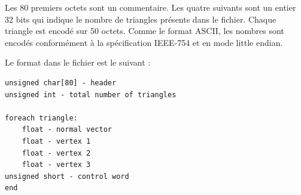 Les 80 premiers octets sont un commentaire. Les quatre suivants sont un entier 32 bits qui indique le nombre de triangles présents dans le fichier.
Chaque triangle est encodé sur 50 octets. Comme le format ASCII, les nombres sont encodés conformément à la spécification IEEE-754 et en mode little endian.

Le format dans le fichier est le suivant : 

\begin{lstlisting}[frame=single]
unsigned char[80] - header
unsigned int - total number of triangles

foreach triangle:
    float - normal vector
    float - vertex 1
    float - vertex 2
    float - vertex 3
unsigned short - control word
end
\end{lstlisting}

